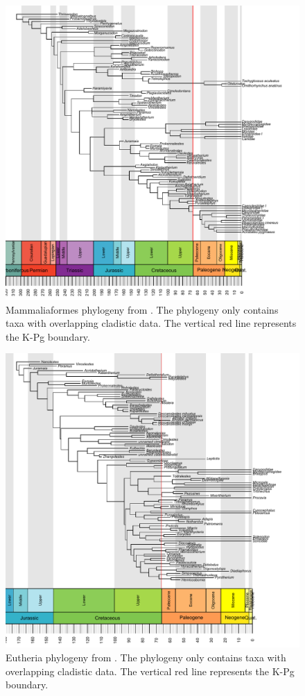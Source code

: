 \begin{figure}[!h]
\centering
    \includegraphics[keepaspectratio=true]{STD/Figures/Slater_tree.pdf}
\caption[Mammaliaformes phylogeny]{Mammaliaformes phylogeny from \cite{Slater2012MEE}. The phylogeny only contains taxa with overlapping cladistic data. The vertical red line represents the K-Pg boundary.}
\label{fig:SlaterTree}
\end{figure}

\begin{figure}[!h]
\centering
    \includegraphics[keepaspectratio=true]{STD/Figures/Beck_tree.pdf}
\caption[Eutheria phylogeny]{Eutheria phylogeny from \cite{beckancient2014}. The phylogeny only contains taxa with overlapping cladistic data. The vertical red line represents the K-Pg boundary.}
\label{fig:BeckTree}
\end{figure}

